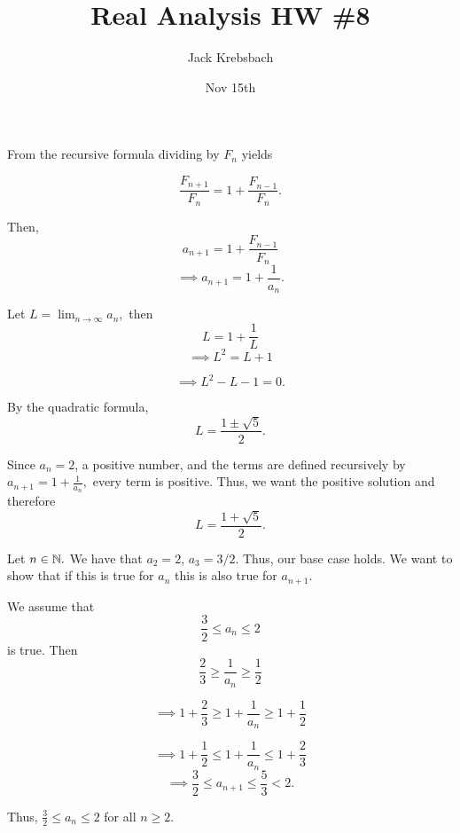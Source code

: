 \documentclass{report}
\title{Real Analysis HW \#8}
\author{Jack Krebsbach }
\date{Nov 15th}
\begin{document}
\maketitle



\sol
From the recursive formula dividing by $F_n$ yields

$$\frac{F_{n+1}}{F_n} = 1 + \frac{F_{n-1}}{F_n}.$$

Then, $$a_{n+1} = 1 + \frac{F_{n-1}}{F_n}$$
$$ \implies a_{n+1} = 1 + \frac{1}{a_n}.$$

Let $L = \lim_{n \rightarrow \infty} a_n,$ then  $$ L = 1 + \frac{1}{L}$$
$$ \implies L^2 = L + 1$$


$$\implies L^2 - L -1=0.$$

By the quadratic formula,  $$L = \frac{ 1 \pm \sqrt{5}}{2}.$$ 

Since $a_n=2$, a positive number, and the terms are defined recursively by $a_{n+1} = 1 + \frac{1}{a_n},$ every term is positive. Thus, we want the positive solution and therefore $$L  = \frac{ 1 + \sqrt{5}}{2}.$$



\pagebreak


\begin{myproof}
    
  Let $n\in \NN.$  We have that  $a_2 = 2$, $a_3 = 3/2.$ Thus, our base case holds. We want to show that if this is true for $a_n$ this is also true for $a_{n+1}.$

We assume that $$ \frac{3}{2} \leq a_n \leq 2$$ is true.  Then
$$ \frac{2}{3} \geq \frac{1}{a_n} \geq \frac{1}{2}$$

$$\implies  1+ \frac{2}{3} \geq 1+ \frac{1}{a_n} \geq 1+\frac{1}{2}$$

$$\implies  1+ \frac{1}{2} \leq 1+ \frac{1}{a_n} \leq 1+\frac{2}{3}$$
$$\implies  \frac{3}{2} \leq a_{n+1} \leq \frac{5}{3} < 2.$$

Thus, $\frac{3}{2} \leq a_n \leq 2$ for all  $n \geq 2.$ 
\end{myproof}
\end{document}
